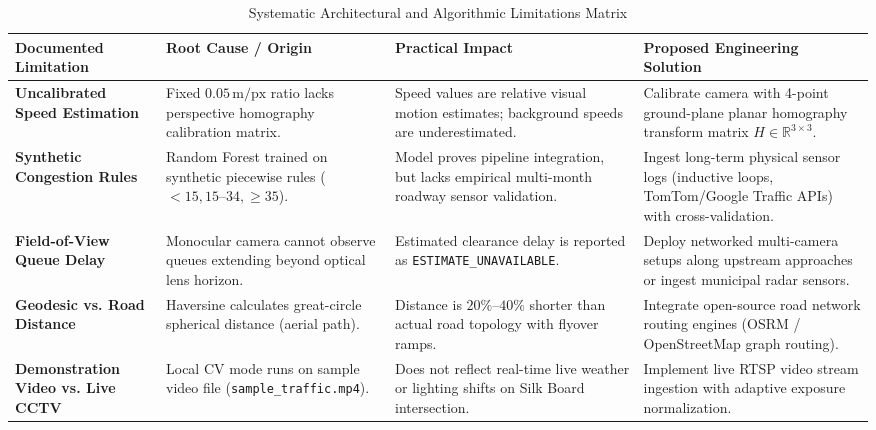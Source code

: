 \documentclass[11pt,a4paper,oneside]{report}
\begin{document}
\begin{table}[h!]
\centering
\small
\begin{tabularx}{\textwidth}{p{3.2cm} p{3.2cm} p{3.2cm} X}
\toprule
\textbf{Documented Limitation} & \textbf{Root Cause / Origin} & \textbf{Practical Impact} & \textbf{Proposed Engineering Solution} \\
\midrule
\textbf{Uncalibrated Speed Estimation} & Fixed $0.05\,\text{m/px}$ ratio lacks perspective homography calibration matrix. & Speed values are relative visual motion estimates; background speeds are underestimated. & Calibrate camera with 4-point ground-plane planar homography transform matrix $H \in \mathbb{R}^{3 \times 3}$. \\
\textbf{Synthetic Congestion Rules} & Random Forest trained on synthetic piecewise rules ($<15, 15\text{--}34, \ge 35$). & Model proves pipeline integration, but lacks empirical multi-month roadway sensor validation. & Ingest long-term physical sensor logs (inductive loops, TomTom/Google Traffic APIs) with cross-validation. \\
\textbf{Field-of-View Queue Delay} & Monocular camera cannot observe queues extending beyond optical lens horizon. & Estimated clearance delay is reported as \texttt{ESTIMATE\_UNAVAILABLE}. & Deploy networked multi-camera setups along upstream approaches or ingest municipal radar sensors. \\
\textbf{Geodesic vs. Road Distance} & Haversine calculates great-circle spherical distance (aerial path). & Distance is $20\%\text{--}40\%$ shorter than actual road topology with flyover ramps. & Integrate open-source road network routing engines (OSRM / OpenStreetMap graph routing). \\
\textbf{Demonstration Video vs. Live CCTV} & Local CV mode runs on sample video file (\texttt{sample\_traffic.mp4}). & Does not reflect real-time live weather or lighting shifts on Silk Board intersection. & Implement live RTSP video stream ingestion with adaptive exposure normalization. \\
\bottomrule
\end{tabularx}
\caption{Systematic Architectural and Algorithmic Limitations Matrix}
\label{tab:limitations_matrix}
\end{table}
\end{document}
